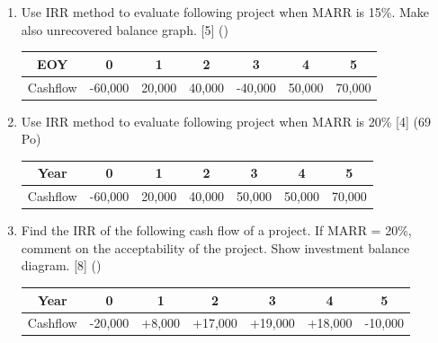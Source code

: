 \documentclass[12pt]{article}
\begin{document}
\begin{enumerate}
				\item Use IRR method to evaluate following project when MARR is 15\%. Make also unrecovered balance graph. \hfill [5] ()\\
				\begin{tabular}{|c|c|c|c|c|c|c|}
					\hline
					EOY & 0 & 1 & 2 & 3 & 4 & 5\\ \hline
					Cashflow & -60,000 & 20,000 & 40,000 & -40,000 & 50,000 & 70,000\\ \hline
				\end{tabular}
				
				\item Use IRR method to evaluate following project when MARR is 20\% \hfill [4] (69 Po)\\
				\begin{tabular}{|c|c|c|c|c|c|c|}
					\hline
					Year & 0 & 1 & 2 & 3 & 4 & 5\\ \hline
					Cashflow & -60,000 & 20,000 & 40,000 & 50,000 & 50,000 & 70,000\\ \hline
				\end{tabular}
				
				\item Find the IRR of the following cash flow of a project. If MARR = 20\%, comment on the acceptability of the project. Show investment balance diagram. \hspace{4cm} [8] ()
				\begin{tabular}{|c|c|c|c|c|c|c|}
					\hline
					Year & 0 & 1 & 2 & 3 & 4 & 5\\ \hline
					Cashflow & -20,000 & +8,000 & +17,000 & +19,000 & +18,000 & -10,000\\ \hline
				\end{tabular}
			\end{enumerate}
\end{document}
